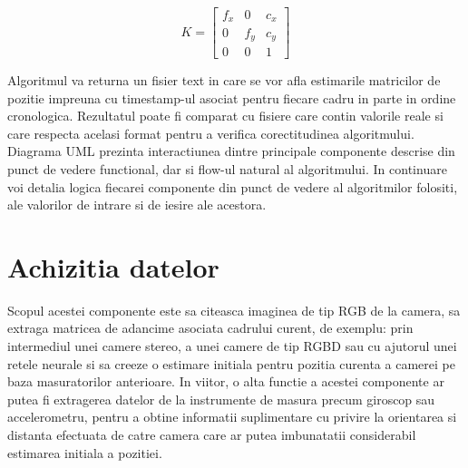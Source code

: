 \documentclass[12pt,a4paper]{report}
\begin{document}
\begin{equation}
    K = 
    \begin{bmatrix}
        f_x & 0   & c_x \\
        0   & f_y & c_y \\
        0   & 0   & 1
    \end{bmatrix}
\end{equation}

Algoritmul va returna un fisier text in care se vor afla estimarile matricilor 
de pozitie impreuna cu timestamp-ul asociat pentru fiecare cadru in parte in ordine
cronologica. Rezultatul poate fi comparat cu fisiere care contin valorile reale si 
care respecta acelasi format pentru a verifica corectitudinea algoritmului.   
Diagrama UML prezinta interactiunea dintre 
principale componente descrise din punct de vedere functional, dar si flow-ul natural
al algoritmului. In continuare voi detalia logica fiecarei componente din punct de 
vedere al algoritmilor folositi, ale valorilor de intrare si de iesire ale acestora. 

\section{Achizitia datelor}
Scopul acestei componente este sa citeasca imaginea de tip RGB de la camera,          
sa extraga matricea de adancime asociata cadrului curent, de exemplu: prin            
intermediul unei camere stereo, a unei camere de tip RGBD sau cu ajutorul unei retele 
neurale si sa creeze o estimare initiala pentru pozitia curenta a camerei pe baza     
masuratorilor anterioare. In viitor, o alta functie a acestei componente ar putea fi  
extragerea datelor de la instrumente de masura precum giroscop sau accelerometru,     
pentru a obtine informatii suplimentare cu privire la orientarea si distanta efectuata
de catre camera care ar putea imbunatatii considerabil estimarea initiala a pozitiei.
\end{document}
